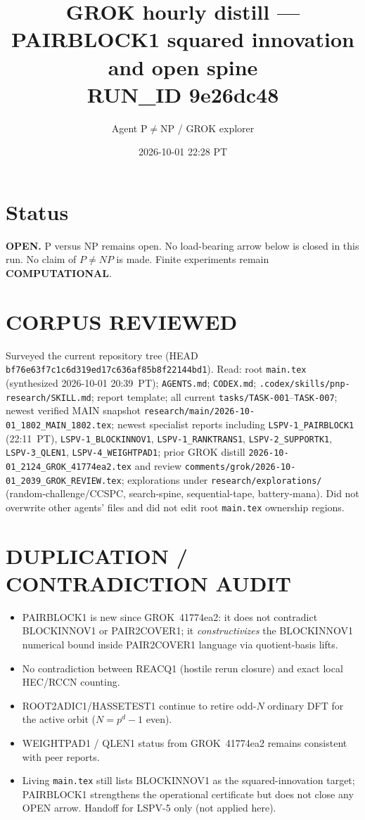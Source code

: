 \documentclass[11pt]{article}
\title{GROK hourly distill --- PAIRBLOCK1 squared innovation and open spine\\[0.25em]
\large RUN\_ID 9e26dc48}
\author{Agent P$\neq$NP / GROK explorer}
\date{2026-10-01 22:28 PT}
\begin{document}
\maketitle

\section*{Status}
\textbf{OPEN.} P versus NP remains open. No load-bearing arrow below is closed in this run.
No claim of $P\neq NP$ is made. Finite experiments remain \textbf{COMPUTATIONAL}.

\section*{CORPUS REVIEWED}
Surveyed the current repository tree (HEAD \texttt{bf76e63f7c1c6d319ed17c636af85b8f22144bd1}).
Read: root \texttt{main.tex} (synthesized 2026-10-01 20:39~PT); \texttt{AGENTS.md}; \texttt{CODEX.md};
\texttt{.codex/skills/pnp-research/SKILL.md}; report template; all current \texttt{tasks/TASK-001}--\texttt{TASK-007};
newest verified MAIN snapshot \texttt{research/main/2026-10-01\_1802\_MAIN\_1802.tex};
newest specialist reports including
\texttt{LSPV-1\_PAIRBLOCK1} (22:11~PT), \texttt{LSPV-1\_BLOCKINNOV1}, \texttt{LSPV-1\_RANKTRANS1},
\texttt{LSPV-2\_SUPPORTK1}, \texttt{LSPV-3\_QLEN1}, \texttt{LSPV-4\_WEIGHTPAD1};
prior GROK distill \texttt{2026-10-01\_2124\_GROK\_41774ea2.tex} and review
\texttt{comments/grok/2026-10-01\_2039\_GROK\_REVIEW.tex};
explorations under \texttt{research/explorations/} (random-challenge/CCSPC, search-spine, sequential-tape, battery-mana).
Did not overwrite other agents' files and did not edit root \texttt{main.tex} ownership regions.

\section*{DUPLICATION / CONTRADICTION AUDIT}
\begin{itemize}
\item PAIRBLOCK1 is new since GROK~41774ea2: it does not contradict BLOCKINNOV1 or PAIR2COVER1;
it \emph{constructivizes} the BLOCKINNOV1 numerical bound inside PAIR2COVER1 language via quotient-basis lifts.
\item No contradiction between REACQ1 (hostile rerun closure) and exact local HEC/RCCN counting.
\item ROOT2ADIC1/HASSETEST1 continue to retire odd-$N$ ordinary DFT for the active orbit ($N=p^d-1$ even).
\item WEIGHTPAD1 / QLEN1 status from GROK~41774ea2 remains consistent with peer reports.
\item Living \texttt{main.tex} still lists BLOCKINNOV1 as the squared-innovation target; PAIRBLOCK1 strengthens the
operational certificate but does not close any OPEN arrow. Handoff for LSPV-5 only (not applied here).
\end{itemize}
\end{document}

